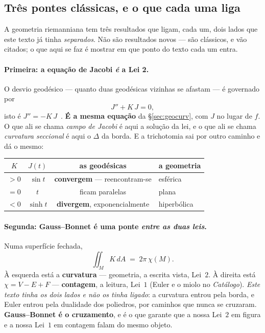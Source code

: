 \documentclass[livro.tex]{subfiles}
\begin{document}
\subsection{Três pontes clássicas, e o que cada uma liga}\label{sec:geopontes}

A geometria riemanniana tem três resultados que ligam, cada um, dois lados que este texto já tinha
\emph{separados}. Não são resultados novos --- são clássicos, e vão citados; o que aqui se faz é
mostrar em que ponto do texto cada um entra.

\paragraph{Primeira: a equação de Jacobi \emph{é} a Lei 2.} O desvio geodésico --- quanto duas
geodésicas vizinhas se afastam --- é governado por
\[
  J'' + K\,J = 0 ,
\]
isto é $J''=-K\,J$~\cite{do-carmo,cheeger-ebin}. \textbf{É a mesma equação} da
\S\ref{sec:geocurv}, com $J$ no lugar de $f$. O que ali se chama \emph{campo de Jacobi} é aqui a
solução da lei, e o que ali se chama \emph{curvatura seccional} é aqui o $\Delta$ da borda. E a
trichotomia sai por outro caminho e dá o mesmo:

\begin{center}\small
\begin{tabular}{@{}cccl@{}}
\toprule
$K$ & $J(t)$ & as geodésicas & a geometria \\
\midrule
$>0$ & $\sin t$  & \textbf{convergem} --- reencontram-se & esférica \\
$=0$ & $t$       & ficam paralelas                        & plana \\
$<0$ & $\sinh t$ & \textbf{divergem}, exponencialmente    & hiperbólica \\
\bottomrule
\end{tabular}
\end{center}

\paragraph{Segunda: Gauss--Bonnet é uma ponte \emph{entre as duas leis}.} Numa superfície fechada,
\[
  \iint_{M} K\,dA \;=\; 2\pi\,\chi(M) .
\]
À esquerda está a \textbf{curvatura} --- geometria, a escrita vista, Lei~$2$. À direita está
$\chi=V-E+F$ --- \textbf{contagem}, a leitura, Lei~$1$ (Euler e o miolo no \emph{Catálogo}). \emph{Este texto tinha
os dois lados e não os tinha ligado}: a curvatura entrou pela borda, e Euler entrou pela
dualidade dos poliedros, por caminhos que nunca se cruzaram. \textbf{Gauss--Bonnet é o cruzamento},
e é o que garante que a nossa Lei~$2$ em figura e a nossa Lei~$1$ em contagem falam do mesmo
objeto.
\end{document}
